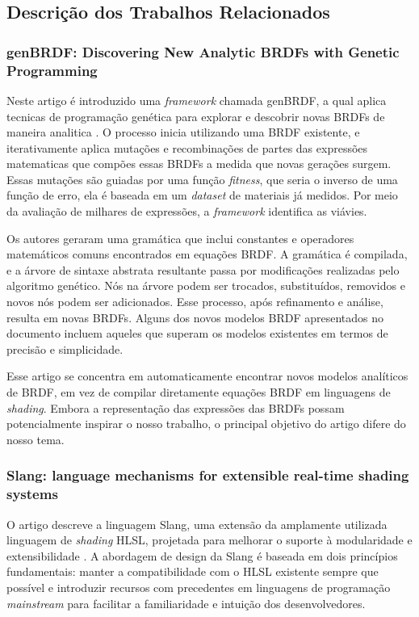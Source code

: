 \documentclass[english, 
               brazil, 
               bsc] %
               {dcomp-abntex2}
\begin{document}
\subsection{Descrição dos Trabalhos Relacionados}

\subsubsection{genBRDF: Discovering New Analytic BRDFs with Genetic Programming}

Neste artigo é introduzido uma  \textit{framework} chamada genBRDF, a qual aplica tecnicas de programação genética para explorar e descobrir novas BRDFs de maneira analitica \cite{genbrdf}. O processo inicia utilizando uma BRDF existente, e iterativamente aplica mutações e recombinações de partes das expressões matematicas que compões essas BRDFs a medida que novas gerações surgem. Essas mutações são guiadas por uma função \textit{fitness}, que seria o inverso de uma função de erro, ela é baseada em um \textit{dataset} de materiais já medidos. Por meio da avaliação de milhares de expressões, a  \textit{framework} identifica as viávies.

Os autores geraram uma gramática que inclui constantes e operadores matemáticos comuns encontrados em equações BRDF. A gramática é compilada, e a árvore de sintaxe abstrata resultante passa por modificações realizadas pelo algoritmo genético. Nós na árvore podem ser trocados, substituídos, removidos e novos nós podem ser adicionados. Esse processo, após refinamento e análise, resulta em novas BRDFs. Alguns dos novos modelos BRDF apresentados no documento incluem aqueles que superam os modelos existentes em termos de precisão e simplicidade.
 
Esse artigo se concentra em automaticamente encontrar novos modelos analíticos de BRDF, em vez de compilar diretamente equações BRDF em linguagens de \textit{shading}. Embora a representação das expressões das BRDFs possam potencialmente inspirar o nosso trabalho, o principal objetivo do artigo difere do nosso tema.

\subsubsection{Slang: language mechanisms for extensible real-time shading systems}

O artigo descreve a linguagem Slang, uma extensão da amplamente utilizada linguagem de \textit{shading} HLSL, projetada para melhorar o suporte à modularidade e extensibilidade \cite{slang}. A abordagem de design da Slang é baseada em dois princípios fundamentais: manter a compatibilidade com o HLSL existente sempre que possível e introduzir recursos com precedentes em linguagens de programação \textit{mainstream} para facilitar a familiaridade e intuição dos desenvolvedores.
\end{document}
